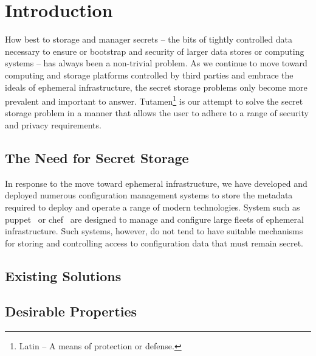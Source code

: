 \section{Introduction}
\label{sec:intro}

How best to storage and manager secrets -- the bits of tightly
controlled data necessary to ensure or bootstrap and security of
larger data stores or computing systems -- has always been a
non-trivial problem. As we continue to move toward computing and
storage platforms controlled by third parties and embrace the ideals
of ephemeral infrastructure, the secret storage problems only become
more prevalent and important to answer. Tutamen\footnote{Latin -- A
  means of protection or defense.} is our attempt to solve the secret
storage problem in a manner that allows the user to adhere to a range
of security and privacy requirements.


\subsection{The Need for Secret Storage}

In response to the move toward ephemeral infrastructure, we have
developed and deployed numerous configuration management systems to
store the metadata required to deploy and operate a range of modern
technologies. System such as puppet~\cite{puppet} or chef~\cite{chef}
are designed to manage and configure large fleets of ephemeral
infrastructure. Such systems, however, do not tend to have suitable
mechanisms for storing and controlling access to configuration data
that must remain secret.

\subsection{Existing Solutions}

\cite{vault}
\cite{confidant}
\cite{openstack-barbican}
\cite{keywhiz}

\subsection{Desirable Properties}
